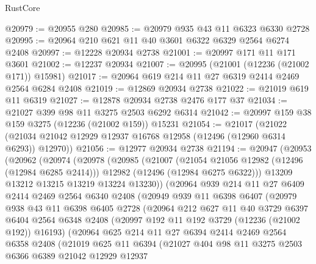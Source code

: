 \begin{lexlean}{RustCore}
\begin{coremodule}
@20979 := @20955 @280
@20985 := @20979 @935 @43 @11 @6323 @6330 @2728
@20995 := @20964 @210 @621 @11 @40 @3601 @6322 @6329 @2564 @6274 @2408
@20997 := @12228 @20934 @2738
@21001 := @20997 @171 @11 @171 @3601
@21002 := @12237 @20934
@21007 := @20995 (@21001 (@12236 (@21002 @171)) @15981)
@21017 := @20964 @619 @214 @11 @27 @6319 @2414 @2469 @2564 @6284 @2408
@21019 := @12869 @20934 @2738
@21022 := @21019 @619 @11 @6319
@21027 := @12878 @20934 @2738 @2476 @177 @37
@21034 := @21027 @399 @98 @11 @3275 @2503 @6292 @6314
@21042 := @20997 @159 @38 @159 @3275 (@12236 (@21002 @159)) @15231
@21054 := @21017
    (@21022 (@21034 @21042 @12929 @12937 @16768 @12958 (@12496 (@12960 @6314 @6293)) @12970))
@21056 := @12977 @20934 @2738
@21194 := @20947
    (@20953
      (@20962
        (@20974
          (@20978
            (@20985
              (@21007
                (@21054 @21056 @12982 (@12496 (@12984 @6285 @2414)))
                @12982
                (@12496 (@12984 @6275 @6322)))
              @13209
              @13212
              @13215
              @13219
              @13224
              @13230))
          (@20964
            @939
            @214
            @11
            @27
            @6409
            @2414
            @2469
            @2564
            @6340
            @2408
            (@20949
              @939
              @11
              @6398
              @6407
              (@20979
                @938
                @43
                @11
                @6398
                @6405
                @2728
                (@20964
                  @212
                  @627
                  @11
                  @40
                  @3729
                  @6397
                  @6404
                  @2564
                  @6348
                  @2408
                  (@20997 @192 @11 @192 @3729 (@12236 (@21002 @192)) @16193)
                  (@20964
                    @625
                    @214
                    @11
                    @27
                    @6394
                    @2414
                    @2469
                    @2564
                    @6358
                    @2408
                    (@21019
                      @625
                      @11
                      @6394
                      (@21027
                        @404
                        @98
                        @11
                        @3275
                        @2503
                        @6366
                        @6389
                        @21042
                        @12929
                        @12937

\end{coremodule}
\end{lexlean}
